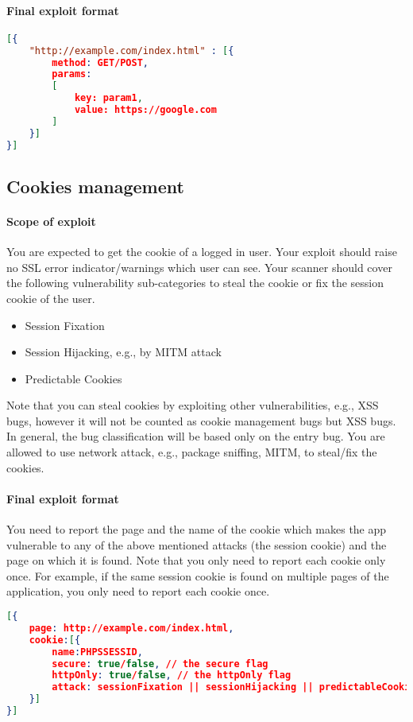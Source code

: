 \documentclass{article}[10pt]
\begin{document}
\paragraph{Final exploit format\\} 
\begin{lstlisting}[language=json,firstnumber=1]
[{	
	"http://example.com/index.html" : [{
		method: GET/POST,
		params: 
		[
			key: param1,
			value: https://google.com
		]
	}]
}]
\end{lstlisting}

\subsection{Cookies management}
\paragraph{Scope of exploit}
You are expected to get the cookie of a logged in user. Your exploit should raise no SSL error indicator/warnings which user can see. Your scanner should cover the following vulnerability sub-categories to steal the cookie or fix the session cookie of the user. 
	\begin{itemize}
		\item Session Fixation
		\item Session Hijacking, e.g., by MITM attack
		\item Predictable Cookies
	\end{itemize}

Note that you can steal cookies by exploiting other vulnerabilities, e.g., XSS bugs, however it will not be counted as cookie management bugs but XSS bugs. In general, the bug classification will be based only on the entry bug. 
You are allowed to use network attack, e.g., package sniffing, MITM, to steal/fix the cookies.

\paragraph{Final exploit format}
You need to report the page and the name of the cookie which makes the app vulnerable to any of the above mentioned attacks (the session cookie) and the page on which it is found. Note that you only need to report each cookie only once. For example, if the same session cookie is found on multiple pages of the application, you only need to report each cookie once. 

\begin{lstlisting}[language=json,firstnumber=1]
[{
	page: http://example.com/index.html,
	cookie:[{
		name:PHPSSESSID,
		secure: true/false, // the secure flag
		httpOnly: true/false, // the httpOnly flag
		attack: sessionFixation || sessionHijacking || predictableCookies
	}]
}]
\end{lstlisting}
\end{document}
